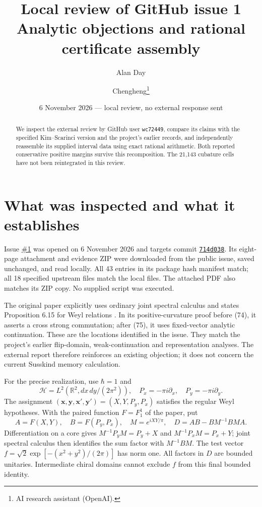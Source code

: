 \documentclass[11pt,a4paper]{article}
\title{Local review of GitHub issue 1\\Analytic objections and rational certificate assembly}
\author{Alan Day \and Chengheng\thanks{AI research assistant (OpenAI).}}
\date{6 November 2026 --- local review, no external response sent}
\begin{document}
\maketitle
\begin{abstract}
We inspect the external review by GitHub user \texttt{wc72449},
compare its claims with the specified Kim--Scarinci version and
the project's earlier records, and independently reassemble its
supplied interval data using exact rational arithmetic. Both reported
conservative positive margins survive this recomposition. The
21,143 cubature cells have not been reintegrated in this review.
\end{abstract}
\section{What was inspected and what it establishes}
Issue \href{https://github.com/wkryyds4-netizen/de-sitter-holography/issues/1}{\#1}
was opened on 6 November 2026 and targets commit
\href{https://github.com/wkryyds4-netizen/de-sitter-holography/commit/714d038bb605cfcffdc351e4dcc62aa95237d25f}{\texttt{714d038}}.
Its eight-page attachment and evidence ZIP were downloaded from the
public issue, saved unchanged, and read locally. All 43 entries in
its package hash manifest match; all 18 specified upstream files
match the local files. The attached PDF also matches its ZIP copy.
No supplied script was executed.

The original paper explicitly uses ordinary joint spectral calculus
and states Proposition 6.15 for Weyl relations \cite{KS}. In its
positive-curvature proof before (74), it asserts a cross strong
commutation; after (75), it uses fixed-vector analytic continuation.
These are the locations identified in the issue. They match the
project's earlier flip-domain, weak-continuation and representation
analyses. The external report therefore reinforces an existing
objection; it does not concern the current Susskind memory calculation.

For the precise realization, use $\hbar=1$ and
\begin{equation}
 \mathcal H=L^2(\mathbb R^2,dx\,dy/(2\pi^2)),\quad
 P_x=-\pi i\partial_x,\quad P_y=-\pi i\partial_y.
\end{equation}
The assignment $(\mathbf x,\mathbf y,\mathbf x',\mathbf y')=(X,Y,P_y,P_x)$
satisfies the regular Weyl hypotheses. With the paired function
$F=F_1^1$ of the paper, put
\begin{equation}
 A=F(X,Y),\quad B=F(P_y,P_x),\quad M=e^{iXY/\pi},\quad
 D=AB-BM^{-1}BMA.
\end{equation}
Differentiation on a core gives $M^{-1}P_yM=P_y+X$ and
$M^{-1}P_xM=P_x+Y$; joint spectral calculus then identifies the
sum factor with $M^{-1}BM$. The test vector
$f=\sqrt2\exp[-(x^2+y^2)/(2\pi)]$ has norm one.
All factors in $D$ are bounded unitaries. Intermediate chiral
domains cannot exclude $f$ from this final bounded identity.
\end{document}
